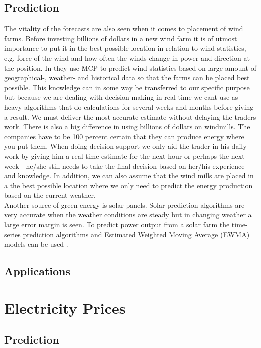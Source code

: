 \documentclass[twoside,11pt,openright]{report}
\begin{document}
\subsection{Prediction}

The vitality of the forecasts are also seen when it comes to
placement of wind farms. Before investing billions of dollars in a new wind farm it is of utmost importance to put it in the best possible location in relation to wind statistics, e.g. force of the wind and how often the winds change in power and direction at the position. In \cite{4} they use MCP to predict wind statistics based on large amount of geographical-, weather- and historical data so that the farms can be placed best possible. This knowledge can in some way be transferred to our specific purpose but because we are dealing with decision making in real time we cant use as heavy algorithms that do calculations for several weeks and months before giving a result. We must deliver the most accurate estimate without delaying the traders work.
There is also a big difference in using billions of dollars on windmills. The companies have to be 100 percent certain that they can produce energy where you put them. When doing decision support we only aid the trader in his daily work by giving him a real time estimate for the next hour or perhaps the next week - he/she still needs to take the final decision based on her/his experience and knowledge. In addition, we can also assume that the wind mills are placed in a the best possible location where we only need to predict the energy production based on the current weather.
\\[0.5cm]
Another source of green energy is solar panels. Solar
prediction algorithms are very accurate when the weather conditions are steady but in changing weather a large error margin is seen. To predict power output from a solar farm the time-series prediction algorithms and Estimated Weighted Moving Average (EWMA) models can be used \cite{5}.

\subsection{Applications}

\section{Electricity Prices}
\subsection{Prediction}

\\[0.5cm]

\\[0.5cm]

\\[0.5cm]

\end{document}
